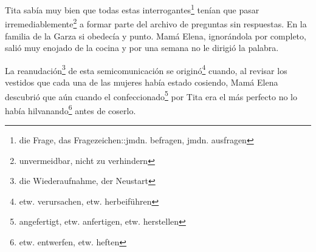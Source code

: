Tita sabía muy bien que todas estas interrogantes\footnote{die Frage, das Fragezeichen::jmdn. befragen, jmdn. ausfragen}
tenían que pasar irremediablemente\footnote{unvermeidbar, nicht zu verhindern}
a formar parte del archivo de preguntas sin respuestas. En la familia de
la Garza si obedecía y punto. Mamá Elena, ignorándola por completo, salió
muy enojado de la cocina y por una semana no le dirigió la palabra.

La reanudación\footnote{die Wiederaufnahme, der Neustart}
de esta semicomunicación se originó\footnote{etw. verursachen, etw. herbeiführen}
cuando, al revisar los vestidos que cada una de las mujeres había estado
cosiendo, Mamá Elena descubrió que aún cuando el confeccionado\footnote{angefertigt, etw. anfertigen, etw. herstellen}
por Tita era el más perfecto no lo había hilvanando\footnote{etw. entwerfen, etw. heften}
antes de coserlo.

